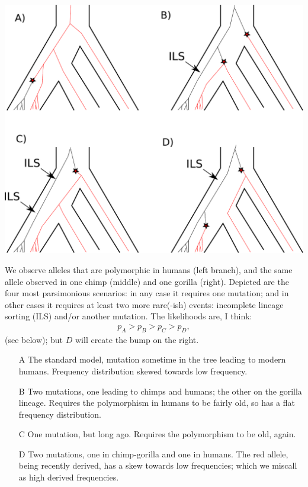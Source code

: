 \documentclass{article}
\begin{document}
\begin{center}
\includegraphics[width=\textwidth]{hcg-trees}
\end{center}
\vskip 2cm

We observe alleles that are polymorphic in humans (left branch),
and the same allele observed in one chimp (middle) and one gorilla (right).
Depicted are the four most parsimonious scenarios: 
in any case it requires one mutation;
and in other cases it requires at least two more rare(-ish) events:
incomplete lineage sorting (ILS) and/or another mutation.
The likelihoods are, I think:
\begin{align}
  p_A > p_B > p_C > p_D ,
\end{align}
(see below); but $D$ will create the bump on the right.

\begin{enumerate}

\item[A] The standard model, mutation sometime in the tree leading to modern humans.
Frequency distribution skewed towards low frequency.

\item[B] Two mutations, one leading to chimps and humans; the other on the gorilla lineage.  Requires the polymorphism in humans to be fairly old, so has a flat frequency distribution.

\item[C] One mutation, but long ago.  Requires the polymorphism to be old, again.

\item[D] Two mutations, one in chimp-gorilla and one in humans.  The red allele, being recently derived, has a skew towards low frequencies; which we miscall as high derived frequencies.

\end{enumerate}
\end{document}
